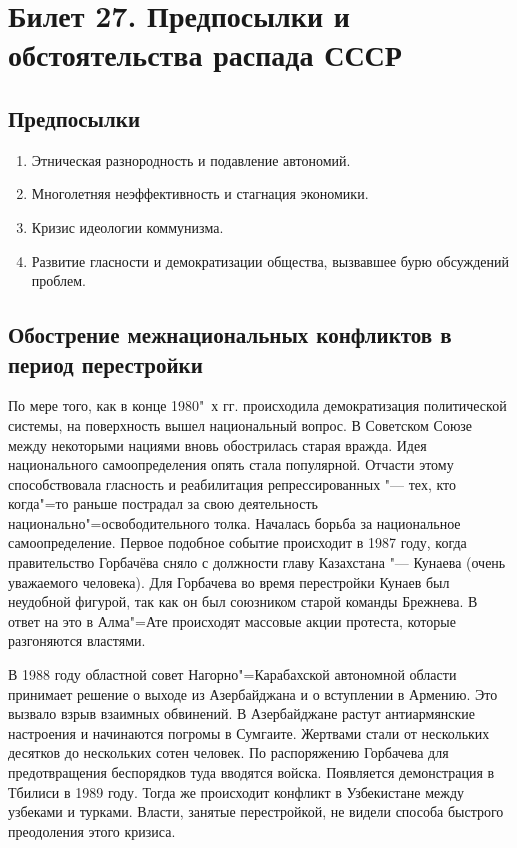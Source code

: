 \section{Билет 27. Предпосылки и обстоятельства распада СССР}

\subsection{Предпосылки}
\begin{enumerate}
    \item Этническая разнородность и подавление автономий.
    \item Многолетняя неэффективность и стагнация экономики.
    \item Кризис идеологии коммунизма.
    \item Развитие гласности и демократизации общества, вызвавшее бурю обсуждений проблем.
\end{enumerate}

\subsection{Обострение межнациональных конфликтов в период перестройки}
По мере того, как в конце 1980"~х гг. происходила демократизация политической системы, на поверхность вышел национальный вопрос. В Советском Союзе между некоторыми нациями вновь обострилась старая вражда. Идея национального самоопределения опять стала популярной. Отчасти этому способствовала гласность и реабилитация репрессированных "--- тех, кто когда"=то раньше пострадал за свою деятельность национально"=освободительного толка. Началась борьба за национальное самоопределение. Первое подобное событие происходит в 1987 году, когда правительство Горбачёва сняло с должности главу Казахстана "--- Кунаева (очень уважаемого человека). Для Горбачева во время перестройки Кунаев был неудобной фигурой, так как он был союзником старой команды Брежнева. В ответ на это в Алма"=Ате происходят массовые акции протеста, которые разгоняются властями. 

В 1988 году областной совет Нагорно"=Карабахской автономной области принимает решение о выходе из Азербайджана и о вступлении в Армению. Это вызвало взрыв взаимных обвинений. В Азербайджане растут антиармянские настроения и начинаются погромы в Сумгаите. Жертвами стали от нескольких десятков до нескольких сотен человек. По распоряжению Горбачева для предотвращения беспорядков туда вводятся войска. Появляется демонстрация в Тбилиси в 1989 году. Тогда же происходит конфликт в Узбекистане между узбеками и турками. Власти, занятые перестройкой, не видели способа быстрого преодоления этого кризиса. 

